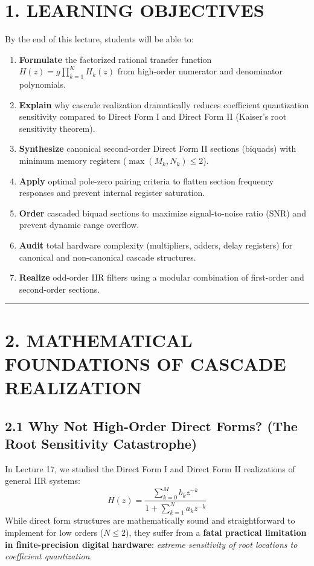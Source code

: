 \documentclass[11pt,a4paper]{article}
\begin{document}
\section{1. LEARNING OBJECTIVES}
By the end of this lecture, students will be able to:
\begin{enumerate}
    \item \textbf{Formulate} the factorized rational transfer function $H(z) = g \prod_{k=1}^K H_k(z)$ from high-order numerator and denominator polynomials.
    \item \textbf{Explain} why cascade realization dramatically reduces coefficient quantization sensitivity compared to Direct Form I and Direct Form II (Kaiser's root sensitivity theorem).
    \item \textbf{Synthesize} canonical second-order Direct Form II sections (biquads) with minimum memory registers ($\max(M_k, N_k) \le 2$).
    \item \textbf{Apply} optimal pole-zero pairing criteria to flatten section frequency responses and prevent internal register saturation.
    \item \textbf{Order} cascaded biquad sections to maximize signal-to-noise ratio (SNR) and prevent dynamic range overflow.
    \item \textbf{Audit} total hardware complexity (multipliers, adders, delay registers) for canonical and non-canonical cascade structures.
    \item \textbf{Realize} odd-order IIR filters using a modular combination of first-order and second-order sections.
\end{enumerate}

\noindent\rule{\textwidth}{0.5pt}

\section{2. MATHEMATICAL FOUNDATIONS OF CASCADE REALIZATION}

\subsection{2.1 Why Not High-Order Direct Forms? (The Root Sensitivity Catastrophe)}
In Lecture 17, we studied the Direct Form I and Direct Form II realizations of general IIR systems:
\begin{equation}
H(z) = \frac{\sum_{k=0}^{M} b_k z^{-k}}{1 + \sum_{k=1}^{N} a_k z^{-k}}
\end{equation}
While direct form structures are mathematically sound and straightforward to implement for low orders ($N \le 2$), they suffer from a \textbf{fatal practical limitation in finite-precision digital hardware}: \textit{extreme sensitivity of root locations to coefficient quantization}.
\end{document}

